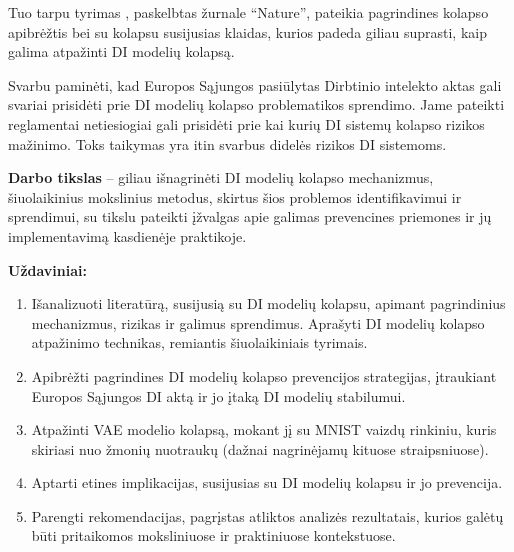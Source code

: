 \documentclass{VUMIFInfKursinis}
\begin{document}

Tuo tarpu tyrimas \cite{AICollapseNature}, paskelbtas žurnale \enquote{Nature}, pateikia pagrindines kolapso apibrėžtis bei su kolapsu susijusias klaidas, kurios padeda giliau suprasti, kaip galima atpažinti DI modelių kolapsą.

Svarbu paminėti, kad Europos Sąjungos pasiūlytas Dirbtinio intelekto aktas \cite{AIEuropeanAct} gali svariai prisidėti prie DI modelių kolapso problematikos sprendimo. Jame pateikti reglamentai netiesiogiai gali prisidėti prie kai kurių DI sistemų kolapso rizikos mažinimo. Toks taikymas yra itin svarbus didelės rizikos DI sistemoms.




\textbf{Darbo tikslas} – giliau išnagrinėti DI modelių kolapso mechanizmus,  šiuolaikinius mokslinius metodus, skirtus šios problemos identifikavimui ir sprendimui, su tikslu pateikti įžvalgas apie galimas prevencines priemones ir jų implementavimą kasdienėje praktikoje.

\textbf{Uždaviniai:}
\begin{enumerate}
    \item Išanalizuoti literatūrą, susijusią su DI modelių kolapsu, apimant pagrindinius mechanizmus, rizikas ir galimus sprendimus. Aprašyti DI modelių kolapso atpažinimo technikas, remiantis šiuolaikiniais tyrimais.
    \item Apibrėžti pagrindines DI modelių kolapso prevencijos strategijas, įtraukiant Europos Sąjungos DI aktą ir jo įtaką DI modelių stabilumui.
    \item Atpažinti VAE modelio kolapsą, mokant jį su MNIST vaizdų rinkiniu, kuris skiriasi nuo žmonių nuotraukų (dažnai nagrinėjamų kituose straipsniuose).
    \item Aptarti etines implikacijas, susijusias su DI modelių kolapsu ir jo prevencija.
    \item Parengti rekomendacijas, pagrįstas atliktos analizės rezultatais, kurios galėtų būti pritaikomos moksliniuose ir praktiniuose kontekstuose.
\end{enumerate}
\end{document}
